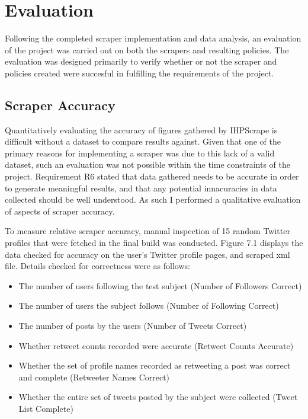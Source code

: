 \chapter{Evaluation}\label{C:us}

Following the completed scraper implementation and data analysis, an evaluation of the project was carried out on both the scrapers and resulting policies. The evaluation was designed primarily to verify whether or not the scraper and policies created were succesful in fulfilling the requirements of the project.

\section{Scraper Accuracy}

Quantitatively evaluating the accuracy of figures gathered by IHPScrape is difficult without a dataset to compare results against. Given that one of the primary reasons for implementing a scraper was due to this lack of a valid dataset, such an evaluation was not possible within the time constraints of the project. Requirement R6 stated that data gathered needs to be accurate in order to generate meaningful results, and that any potential innacuracies in data collected should be well understood. As such I performed a qualitative evaluation of aspects of scraper accuracy. 

To measure relative scraper accuracy, manual inspection of 15 random Twitter profiles that were fetched in the final build was conducted. Figure 7.1 displays the data checked for accuracy on the user's Twitter profile pages, and scraped xml file. Details checked for correctness were as follows:

\begin{itemize}
 \item The number of users following the test subject (Number of Followers Correct)
 \item The number of users the subject follows (Number of Following Correct)
 \item The number of posts by the users (Number of Tweets Correct)
 \item Whether retweet counts recorded were accurate (Retweet Counts Accurate)
 \item Whether the set of profile names recorded as retweeting a post was correct and complete (Retweeter Names Correct)
 \item Whether the entire set of tweets posted by the subject were collected (Tweet List Complete)
\end{itemize}

